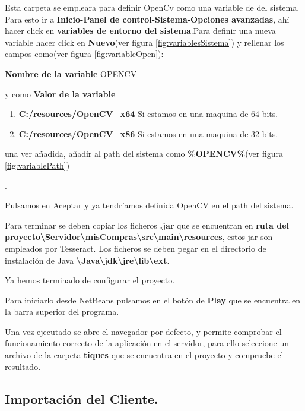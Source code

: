 Esta carpeta se empleara para definir OpenCv como una variable de del sistema.
Para esto ir a \textbf{Inicio-Panel de control-Sistema-Opciones avanzadas}, ahí hacer click en \textbf{variables de entorno del sistema}.Para definir una nueva variable hacer click en \textbf{Nuevo}(ver figura \ref{fig:variablesSistema}) y rellenar los campos como(ver figura \ref{fig:variableOpen}):
	\begin{center}
		\textbf{Nombre de la variable} OPENCV
	\end{center}
	y como \textbf{Valor de la variable}
\begin{enumerate}
	\item \textbf{C:/resources/OpenCV\_x64} Si estamos en una maquina de 64 bits.
	\item \textbf{C:/resources/OpenCV\_x86} Si estamos en una maquina de 32 bits.
\end{enumerate}
una ver añadida, añadir al path del sistema como \textbf{\%OPENCV\%}(ver figura \ref{fig:variablePath})

.

Pulsamos en Aceptar y ya tendríamos definida OpenCV en el path del sistema.

Para terminar se deben copiar los ficheros \textbf{.jar} que se encuentran en \textbf{ruta del proyecto\textbackslash Servidor\textbackslash misCompras\textbackslash src\textbackslash main\textbackslash resources}, estos jar son empleados por Tesseract. Los ficheros se deben pegar en el directorio de instalación de Java \textbf{\textbackslash Java\textbackslash jdk\textbackslash jre\textbackslash lib\textbackslash ext}.

Ya hemos terminado de configurar el proyecto.

Para iniciarlo desde NetBeans pulsamos en el botón de \textbf{Play} que se encuentra en la barra superior del programa.

Una vez ejecutado se abre el navegador por defecto, y permite comprobar el funcionamiento correcto de la aplicación en el servidor, para ello seleccione un archivo de la carpeta \textbf{tiques} que se encuentra en el proyecto y compruebe el resultado.

\subsection{Importación del Cliente.\label{cloneCliente}}

